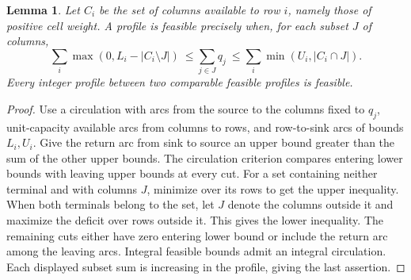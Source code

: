 \documentclass[11pt]{article}
\newtheorem{lemma}[theorem]{Lemma}
\begin{document}
\begin{lemma}\label{support}
Let $C_i$ be the set of columns available to row $i$, namely those of positive cell weight. A profile is feasible precisely when, for each subset $J$ of columns,
\[
 \sum_i\max(0,L_i-|C_i\setminus J|)
 \ \le\sum_{j\in J}q_j\ \le\sum_i\min(U_i,|C_i\cap J|).
\]
Every integer profile between two comparable feasible profiles is feasible.
\end{lemma}
\begin{proof}
Use a circulation with arcs from the source to the columns fixed to $q_j$, unit-capacity available arcs from columns to rows, and row-to-sink arcs of bounds $L_i,U_i$. Give the return arc from sink to source an upper bound greater than the sum of the other upper bounds. The circulation criterion compares entering lower bounds with leaving upper bounds at every cut. For a set containing neither terminal and with columns $J$, minimize over its rows to get the upper inequality. When both terminals belong to the set, let $J$ denote the columns outside it and maximize the deficit over rows outside it. This gives the lower inequality. The remaining cuts either have zero entering lower bound or include the return arc among the leaving arcs. Integral feasible bounds admit an integral circulation. Each displayed subset sum is increasing in the profile, giving the last assertion.
\end{proof}
\end{document}
